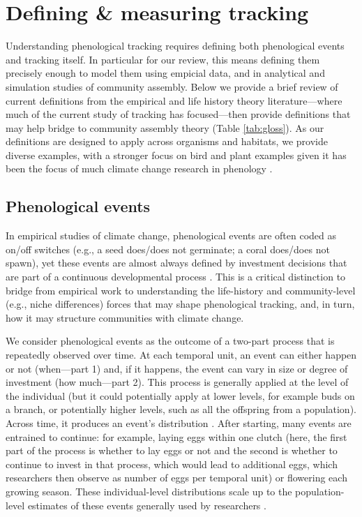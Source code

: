 \documentclass[11pt,letterpaper]{article}
\newcommand{\R}[1]{\label{}\linelabel{#1}}
\begin{document}
\section{Defining \& measuring tracking}
Understanding phenological tracking requires defining both phenological events and tracking itself. In particular for our review, this means defining them precisely enough to model them using empicial data, and in analytical and simulation studies of community assembly. Below we provide a brief review of current definitions from the empirical and life history theory literature---where much of the current study of tracking has focused---then provide definitions that may help bridge to community assembly theory (Table \ref{tab:gloss}). \R{r1whyanimals}As our definitions are designed to apply across organisms and habitats, we provide diverse examples, with a stronger focus on bird and plant examples given it has been the focus of much climate change research in phenology \citep{chuinearees}.\R{r1whyanimalsend}

\subsection{Phenological events}
In empirical studies of climate change, phenological events are often coded as on/off switches (e.g., a seed does/does not germinate; a coral does/does not spawn), yet these events are almost always defined by investment decisions that are part of a continuous developmental process \citep{chuinearees,inouye2019}. This is a critical distinction to bridge from empirical work to understanding the life-history and community-level (e.g., niche differences) forces that may shape phenological tracking, and, in turn, how it may structure communities with climate change. 

We consider phenological events as the outcome of a two-part process that is repeatedly observed over time. At each temporal unit, an event can either happen or not (when---part 1) and, if it happens, the event can vary in size or degree of investment (how much---part 2). This process is generally applied at the level of the individual (but it could potentially apply at lower levels, for example buds on a branch, or potentially higher levels, such as all the offspring from a population). Across time, it produces an event's distribution \citep{gotelli1996,steer2019}. After starting, many events are entrained to continue: for example, laying eggs within one clutch (here, the first part of the process is whether to lay eggs or not and the second is whether to continue to invest in that process, which would lead to additional eggs, which researchers then observe as number of eggs per temporal unit) or flowering each growing season. These individual-level distributions scale up to the population-level estimates of these events generally used by researchers \citep[see][for discussion of the outcomes of this scaling]{inouye2019}. %
\end{document}
